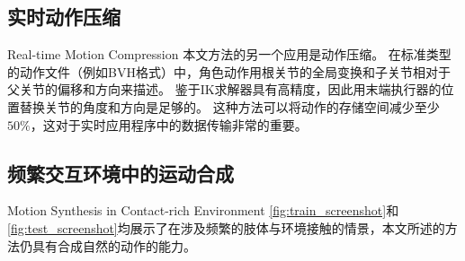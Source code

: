\subsection{实时动作压缩}{Real-time Motion Compression}
本文方法的另一个应用是动作压缩。 在标准类型的动作文件（例如BVH格式）中，角色动作用根关节的全局变换和子关节相对于父关节的偏移和方向来描述。 鉴于IK求解器具有高精度，因此用末端执行器的位置替换关节的角度和方向是足够的。 这种方法可以将动作的存储空间减少至少$50\%$，这对于实时应用程序中的数据传输非常的重要。

\subsection{频繁交互环境中的运动合成}{Motion Synthesis in Contact-rich Environment}
\cref{fig:train_screenshot}和\cref{fig:test_screenshot}均展示了在涉及频繁的肢体与环境接触的情景，本文所述的方法仍具有合成自然的动作的能力。
